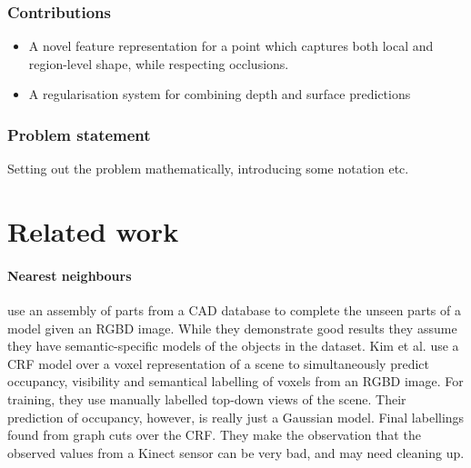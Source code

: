 \documentclass[10pt,twocolumn,letterpaper]{article}
\makeatletter
\newcommand*{\ea}{et al.\@\xspace}
\makeatother
\begin{document}
\subsubsection{Contributions}
\begin{itemize}
\item A novel feature representation for a point which captures both local and region-level shape, while respecting occlusions.
\item A regularisation system for combining depth and surface predictions
\end{itemize}

\subsubsection{Problem statement}

Setting out the problem mathematically, introducing some notation etc.



\section{Related work}





\paragraph{Nearest neighbours}
\cite{shen-tog-2012} use an assembly of parts from a CAD database to complete the unseen parts of a model given an RGBD image. 
While they demonstrate good results they assume they have semantic-specific models of the objects in the dataset.
Kim \ea \cite{kim-iccv-2013} use a CRF model over a voxel representation of a scene to simultaneously predict occupancy, visibility and semantical labelling of voxels from an RGBD image. 
For training, they use manually labelled top-down views of the scene. 
Their prediction of occupancy, however, is really just a Gaussian model. 
Final labellings found from graph cuts over the CRF. 
They make the observation that the observed values from a Kinect sensor can be very bad, and may need cleaning up.
\end{document}
